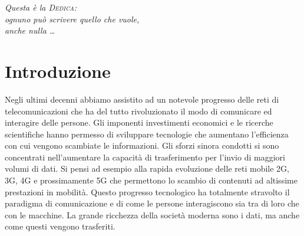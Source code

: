 \documentclass[12pt,a4paper,openright,twoside]{report}
\begin{document}
\begin{titlepage}                       %
%
\thispagestyle{empty}                   %
\topmargin=6.5cm                        %
\raggedleft                             %
\large                                  %
\em                                     %
Questa \`e la \textsc{Dedica}:\\
ognuno pu\`o scrivere quello che vuole, \\
anche nulla \ldots                      %
\newpage                                %
%
\clearpage{\pagestyle{empty}\cleardoublepage}%
\end{titlepage}
\chapter*{Introduzione}                 %
Negli ultimi decenni abbiamo assistito ad un notevole progresso delle reti di telecomunicazioni che ha del tutto rivoluzionato il modo di comunicare ed interagire delle persone. Gli imponenti investimenti economici e le ricerche scientifiche hanno permesso di sviluppare tecnologie che aumentano l'efficienza con cui vengono scambiate le informazioni.
Gli sforzi sinora condotti si sono concentrati nell'aumentare la capacit\`a di trasferimento per l'invio di maggiori volumi di dati. 
Si pensi ad esempio alla rapida evoluzione delle reti mobile 2G, 3G, 4G e prossimamente 5G che permettono lo scambio di contenuti ad altissime prestazioni in mobilit\`a. Questo progresso tecnologico ha totalmente stravolto il paradigma di comunicazione e di come le persone interagiscono sia tra di loro che con le macchine. La grande ricchezza della societ\`a moderna sono i dati, ma anche come questi vengono trasferiti. 
\end{document}
